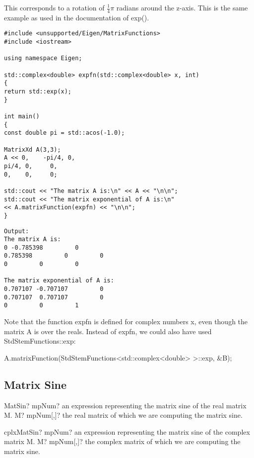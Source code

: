 This corresponds to a rotation of $\tfrac{1}{4}\pi$ radians around the z-axis. This is the same example as used in the documentation of exp().


\begin{lstlisting}
#include <unsupported/Eigen/MatrixFunctions>
#include <iostream>

using namespace Eigen;

std::complex<double> expfn(std::complex<double> x, int)
{
return std::exp(x);
}

int main()
{
const double pi = std::acos(-1.0); 

MatrixXd A(3,3);
A << 0,    -pi/4, 0,
pi/4, 0,     0,
0,    0,     0;  

std::cout << "The matrix A is:\n" << A << "\n\n";  
std::cout << "The matrix exponential of A is:\n"             
<< A.matrixFunction(expfn) << "\n\n";
}
\end{lstlisting}

\begin{verbatim}
Output:
The matrix A is:
0 -0.785398         0
0.785398         0         0
0         0         0

The matrix exponential of A is:
0.707107 -0.707107         0
0.707107  0.707107         0
0         0         1

\end{verbatim}
Note that the function expfn is defined for complex numbers x, even though the matrix A is over the reals. Instead of expfn, we could also have used StdStemFunctions::exp: 

A.matrixFunction(StdStemFunctions<std::complex<double> >::exp, \&B);



\subsection{Matrix Sine}


\begin{mpFunctionsExtract}
	\mpFunctionOne
	{MatSin? mpNum? an expression representing the matrix sine of the real matrix M.}
	{M? mpNum[,]? the real matrix of which we are computing the matrix sine.}
\end{mpFunctionsExtract}

\vspace{0.6cm}
\begin{mpFunctionsExtract}
	\mpFunctionOne
	{cplxMatSin? mpNum? an expression representing the matrix sine of the complex matrix M.}
	{M? mpNum[,]? the complex matrix of which we are computing the matrix sine.}
\end{mpFunctionsExtract}

